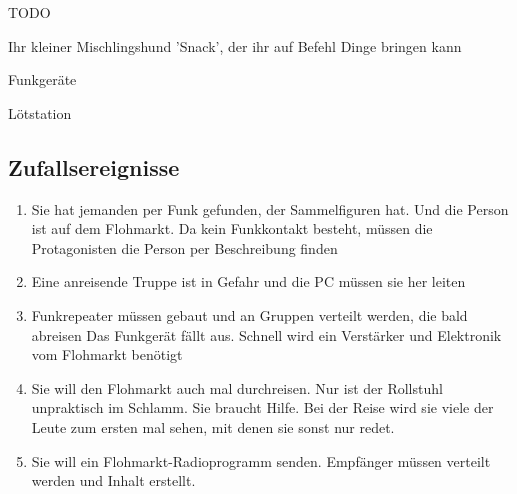 \begin{npcBox}[title=Antigone]
    \begin{stunts}
    \item {}
    \end{stunts}

    \begin{stressSection}
    \end{stressSection}
    \begin{tabularx}{\textwidth}{ XX }
    \end{tabularx}

    \begin{consequences}
    \item {}
    \item {}
    \item {}
    \end{consequences}

    \begin{npcDescription}
    TODO
    \end{npcDescription}


    \begin{equipment}
    \item Ihr kleiner Mischlingshund 'Snack', der ihr auf Befehl Dinge bringen kann
    \item Funkgeräte
    \item Lötstation
    \end{equipment}
\end{npcBox}

\subsection{Zufallsereignisse}

\begin{enumerate}
\item Sie hat jemanden per Funk gefunden, der Sammelfiguren hat. Und die Person ist auf dem Flohmarkt. Da kein Funkkontakt besteht, müssen die Protagonisten die Person per Beschreibung finden
\item Eine anreisende Truppe ist in Gefahr und die PC müssen sie her leiten
\item Funkrepeater müssen gebaut und an Gruppen verteilt werden, die bald abreisen
Das Funkgerät fällt aus. Schnell wird ein Verstärker und Elektronik vom Flohmarkt benötigt
\item Sie will den Flohmarkt auch mal durchreisen. Nur ist der Rollstuhl unpraktisch im Schlamm. Sie braucht Hilfe. Bei der Reise wird sie viele der Leute zum ersten mal sehen, mit denen sie sonst nur redet.
\item Sie will ein Flohmarkt-Radioprogramm senden. Empfänger müssen verteilt werden und Inhalt erstellt.
\end{enumerate}

